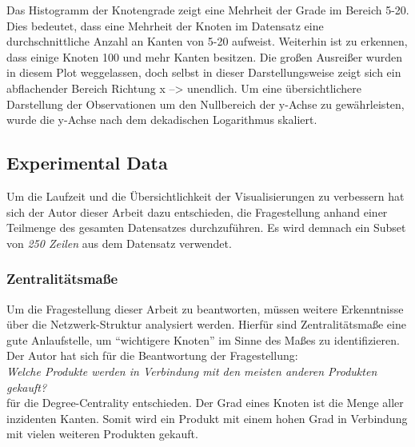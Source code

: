 \documentclass[
  12 pt,
]{article}
\newenvironment{Shaded}{\begin{snugshade}}{\end{snugshade}}
\newcommand{\CommentTok}[1]{\textcolor[rgb]{0.56,0.35,0.01}{\textit{#1}}}
\newcommand{\DataTypeTok}[1]{\textcolor[rgb]{0.13,0.29,0.53}{#1}}
\newcommand{\DecValTok}[1]{\textcolor[rgb]{0.00,0.00,0.81}{#1}}
\newcommand{\KeywordTok}[1]{\textcolor[rgb]{0.13,0.29,0.53}{\textbf{#1}}}
\newcommand{\NormalTok}[1]{#1}
\newcommand{\OperatorTok}[1]{\textcolor[rgb]{0.81,0.36,0.00}{\textbf{#1}}}
\newcommand{\StringTok}[1]{\textcolor[rgb]{0.31,0.60,0.02}{#1}}
\begin{document}
Das Histogramm der Knotengrade zeigt eine Mehrheit der Grade im Bereich
5-20. Dies bedeutet, dass eine Mehrheit der Knoten im Datensatz eine
durchschnittliche Anzahl an Kanten von 5-20 aufweist. Weiterhin ist zu
erkennen, dass einige Knoten 100 und mehr Kanten besitzen. Die großen
Ausreißer wurden in diesem Plot weggelassen, doch selbst in dieser
Darstellungsweise zeigt sich ein abflachender Bereich Richtung x
--\textgreater{} unendlich. Um eine übersichtlichere Darstellung der
Observationen um den Nullbereich der y-Achse zu gewährleisten, wurde die
y-Achse nach dem dekadischen Logarithmus skaliert.

\hypertarget{experimental-data}{%
\subsection{Experimental Data}\label{experimental-data}}

Um die Laufzeit und die Übersichtlichkeit der Visualisierungen zu
verbessern hat sich der Autor dieser Arbeit dazu entschieden, die
Fragestellung anhand einer Teilmenge des gesamten Datensatzes
durchzuführen. Es wird demnach ein Subset von \emph{250 Zeilen} aus dem
Datensatz verwendet.

\begin{Shaded}
\end{Shaded}

\hypertarget{zentralituxe4tsmauxdfe}{%
\subsubsection{Zentralitätsmaße}\label{zentralituxe4tsmauxdfe}}

Um die Fragestellung dieser Arbeit zu beantworten, müssen weitere
Erkenntnisse über die Netzwerk-Struktur analysiert werden. Hierfür sind
Zentralitätsmaße eine gute Anlaufstelle, um ``wichtigere Knoten'' im
Sinne des Maßes zu identifizieren. Der Autor hat sich für die
Beantwortung der Fragestellung:\\
\emph{Welche Produkte werden in Verbindung mit den meisten anderen
Produkten gekauft?}\\
für die Degree-Centrality entschieden. Der Grad eines Knoten ist die
Menge aller inzidenten Kanten. Somit wird ein Produkt mit einem hohen
Grad in Verbindung mit vielen weiteren Produkten gekauft.
\end{document}
